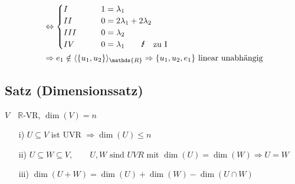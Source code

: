 \documentclass[12pt,titlepage, pdf]{article}
\newcommand{\R}{\mathds{R}}
\newcommand{\vecspace}[2]{\langle#1\rangle_{#2}}
\newcommand{\vecspaceR}[1]{\vecspace{#1}{\R}}
\renewcommand{\>}{\rightarrow}
\renewcommand{\*}{\cdot}
\begin{document}
\begin{itemize}
\begin{itemize}
\begin{align*}
		&\Leftrightarrow 
		\begin{cases}
		I\qquad &1 = \lambda_1 \\
		II\qquad&0 = 2 \lambda_1 + 2 \lambda_2 \\
		III\qquad&0 = \lambda_2  \\
		IV\qquad&0 = \lambda_1 \textrm{\qquad \Lightning\quad zu I} 								
		\end{cases} 
		\\
		&\Rightarrow e_1 \notin \vecspaceR{\{u_1,u_2\}} \Rightarrow \{u_1,u_2,e_1\} \text{ linear unabhängig}
		\end{align*}
	\end{itemize}
\end{itemize}
		\subsection{Satz (Dimensionssatz)}
$V\quad\R$-VR, $\dim(V) = n$ \\
\begin{itemize}
	\item[i)] $U \subseteq V $ ist UVR $ \Rightarrow \dim(U) \leq n$
	\item[ii)] $U \subseteq W \subseteq V,\qquad U,W \textrm{ sind } UVR$ mit $\dim(U) = \dim(W) \Rightarrow U = W$
	\item[iii)] $\dim(U+W) = \dim(U) + \dim(W) - \dim(U \cap W)$
\end{itemize}	
\end{document}
